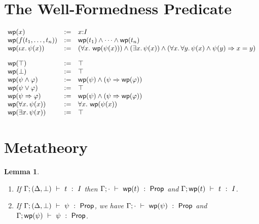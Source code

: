 \documentclass[11pt]{article}
\newtheorem{lemma}{Lemma}
\begin{document}
\section{The Well-Formedness Predicate}


\[
\begin{array}{lll}
  \mathop{\mathsf{wp}}(x) & := & x{:}I\\
  \mathop{\mathsf{wp}}(f({t}_1,\ldots,{t}_{n})) & := & \mathop{\mathsf{wp}}(t_1) \wedge \cdots \wedge \mathop{\mathsf{wp}}(t_n)\\
  \mathop{\mathsf{wp}}(\iota x.\, \psi(x)) & := &
       (\forall x.\, \mathop{\mathsf{wp}}(\psi(x))) \wedge
       (\exists x.\, \psi(x)) \wedge
       (\forall x.\, \forall y.\, \psi(x) \wedge \psi(y) \Rightarrow x=y)\\[10pt]

  \mathop{\mathsf{wp}}(\top) & := & \top\\
  \mathop{\mathsf{wp}}(\bot) & := & \top\\
  \mathop{\mathsf{wp}}(\psi \wedge \varphi) & := & \mathop{\mathsf{wp}}(\psi) \wedge (\psi \Rightarrow \mathop{\mathsf{wp}}(\varphi))\\
  \mathop{\mathsf{wp}}(\psi \vee \varphi) & := & \top\\
  \mathop{\mathsf{wp}}(\psi \Rightarrow \varphi) & := & \mathop{\mathsf{wp}}(\psi) \wedge (\psi \Rightarrow \mathop{\mathsf{wp}}(\varphi))\\
  \mathop{\mathsf{wp}}(\forall x.\, \psi(x)) & := & \forall x.\, \mathop{\mathsf{wp}}(\psi(x))\\
  \mathop{\mathsf{wp}}(\exists x.\, \psi(x)) & := & \top\\
\end{array}
\]

\clearpage

\section{Metatheory}

\begin{lemma}
\mbox{}
  \begin{enumerate}
  \item If $\Gamma;(\Delta,\bot)\ \vdash\ t\ :\ I$ then
    $\Gamma;\cdot\ \vdash\ \mathop{\mathsf{wp}}(t)\ :\ \mathsf{Prop}$ and
    $\Gamma;\mathop{\mathsf{wp}}(t)\ \vdash\ t\ :\ I$.
  \item If $\Gamma;(\Delta,\bot)\ \vdash\ \psi\ :\ \mathsf{Prop}$, we have
    $\Gamma;\cdot\ \vdash\ \mathop{\mathsf{wp}}(\psi)\ :\ \mathsf{Prop}$ and $\Gamma;\mathop{\mathsf{wp}}(\psi)\ \vdash\ \psi\ :\ \mathsf{Prop}$.
  \end{enumerate}
\end{lemma}
\end{document}
